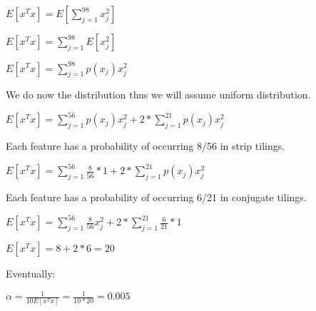 \documentclass[11pt]{article}
\begin{document}
    \noindent  $ E[ x^T x] = E [ \sum_{j=1}^{98} x_j^2  ] $

    \noindent  $ E[ x^T x] = \sum_{j=1}^{98} E [  x_j^2  ] $

    \noindent  $ E[ x^T x] = \sum_{j=1}^{98} p(x_j) x_j^2  $

    \noindent  We do now the distribution thus we will assume uniform distribution.

    \noindent  $ E[ x^T x] = \sum_{j=1}^{56} p(x_j) x_j^2 + 2 * \sum_{j=1}^{21} p(x_j) x_j^2  $

    Each feature has a probability of occurring 8/56 in strip tilings.

    \noindent  $ E[ x^T x] = \sum_{j=1}^{56} \frac{8}{56} * 1 + 2 * \sum_{j=1}^{21} p(x_j) x_j^2  $

    Each feature has a probability of occurring 6/21 in conjugate tilings.

    \noindent  $ E[ x^T x] = \sum_{j=1}^{56} \frac{8}{56} x_j^2 + 2 * \sum_{j=1}^{21} \frac{6}{21} * 1   $

    \noindent  $ E[ x^T x] = 8 + 2 * 6 = 20  $

    Eventually:

    \noinden  $ \alpha = \frac{1}{10 E[ x^T x]} = \frac{1}{10 * 20} = 0.005 $
\end{document}
